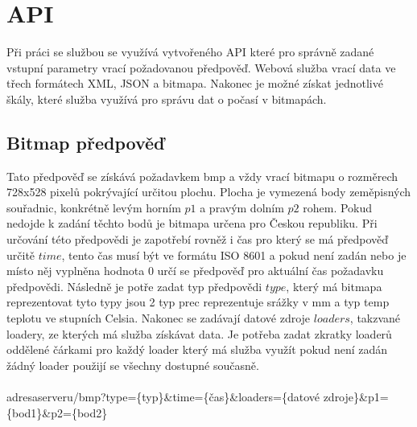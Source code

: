 \documentclass[czech,bachelor,dept460,male,csharp,cpdeclaration]{diploma}
\begin{document}
	\section{API}
	
	Při práci se službou se využívá vytvořeného API které pro správně zadané vstupní parametry vrací požadovanou předpověď. Webová služba vrací data ve třech formátech XML, JSON a bitmapa. Nakonec je možné získat jednotlivé škály, které služba využívá pro správu dat o počasí v bitmapách.
	
	\subsection{Bitmap předpověď}
	
	Tato předpověď se získává požadavkem bmp a vždy vrací bitmapu o rozměrech 728x528 pixelů pokrývající určitou plochu. Plocha je vymezená body zeměpisných souřadnic, konkrétně levým horním $p1$ a pravým dolním $p2$ rohem. Pokud nedojde k zadání těchto bodů je bitmapa určena pro Českou republiku. Při určování této předpovědi je zapotřebí rovněž i čas pro který se má předpověď určitě $time$, tento čas musí být ve formátu ISO 8601 a pokud není zadán nebo je místo něj vyplněna hodnota 0 určí se předpověď pro aktuální čas požadavku předpovědi. Následně je potře zadat typ předpovědi $type$, který má bitmapa reprezentovat tyto typy jsou 2 typ prec reprezentuje srážky v mm a typ temp teplotu ve stupních Celsia. Nakonec se zadávají datové zdroje $loaders$, takzvané loadery, ze kterých má služba získávat data. Je potřeba zadat zkratky loaderů oddělené čárkami pro každý loader který má služba využít pokud není zadán žádný loader použijí se všechny dostupné současně.
	\\\\
	adresaserveru/bmp?type=\{typ\}\&time=\{čas\}\&loaders=\{datové zdroje\}\&p1=\{bod1\}\&p2=\{bod2\}
	
\end{document}
